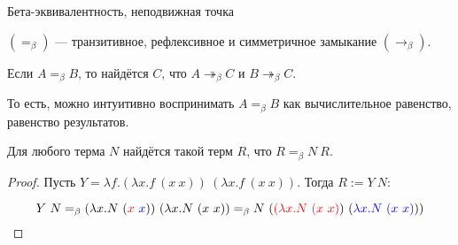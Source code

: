 \documentclass[aspectratio=169]{beamer}
\begin{document}

\begin{frame}{Бета-эквивалентность, неподвижная точка}
\begin{dfn}$(=_\beta)$ --- транзитивное, рефлексивное и симметричное замыкание $(\rightarrow_\beta)$.\end{dfn}

\begin{thm}
Если $A =_\beta B$, то найдётся $C$, что $A \twoheadrightarrow_\beta C$ и $B \twoheadrightarrow_\beta C$.
\end{thm}
То есть, можно интуитивно воспринимать $A =_\beta B$ как вычислительное равенство, равенство результатов.

\begin{thm}Для любого терма $N$ найдётся такой терм $R$, что $R =_\beta N\ R$.\end{thm}
\begin{proof}Пусть $Y = \lambda f.(\lambda x.f\ (x\ x))\ (\lambda x.f\ (x\ x))$.
Тогда $R := Y\ N$:

$$Y\ N =_\beta (\lambda x.N\ ({\color{red}x}\ {\color{blue}x}))\ (\lambda x.N\ (x\ x)) =_\beta N\ ({\color{red}(\lambda x.N\ (x\ x)})\ ({\color{blue}\lambda x.N\ (x\ x)}))$$
\end{proof}
\end{frame}
\end{document}
